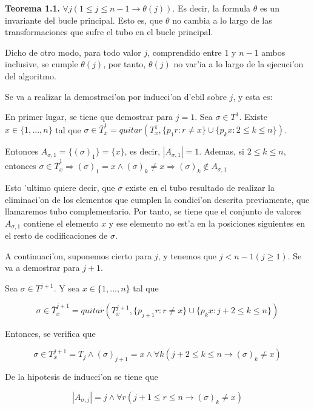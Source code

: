\documentclass[12pt]{article}
\begin{document}
\textbf{Teorema 1.1.} $\forall j (1 \leq j \leq n-1 \longrightarrow \theta(j))$. Es decir, la formula $\theta$ es un invariante del
bucle principal. Esto es, que $\theta$ no cambia a lo largo de las transformaciones que sufre el tubo en el bucle principal.

Dicho de otro modo, para todo valor $j$, comprendido entre $1$ y $n-1$ ambos inclusive, se cumple $\theta(j)$, por tanto, $\theta(j)$
no var'ia a lo largo de la ejecuci'on del algoritmo.

Se va a realizar la demostraci'on por inducci'on d'ebil sobre $j$, y esta es:

En primer lugar, se tiene que demostrar para $j = 1$. Sea $\sigma \in T^{1}$. Existe $x \in \{1,...,n\}$ tal que
$\sigma \in \bar{T}_{x}^{1} = quitar(T_{x}^{1}, \{p_{1}r : r \neq x\} \cup \{p_{k}x : 2 \leq k \leq n\})$.

Entonces $A_{\sigma,1} = \{(\sigma)_{1}\} = \{x\}$, es decir, $|A_{\sigma,1}| = 1$. Ademas, si $2 \leq k \leq n$, entonces
$\sigma \in \bar{T}_{x}^{1} \Longrightarrow (\sigma)_{1} = x \land (\sigma)_{k} \neq x \Longrightarrow (\sigma)_{k}
 \notin A_{\sigma,1}$

Esto 'ultimo quiere decir, que $\sigma$ existe en el tubo resultado de realizar la eliminaci'on de los elementos que cumplen
la condici'on descrita previamente, que llamaremos tubo complementario. Por tanto, se tiene que el conjunto de valores $A_{\sigma,1}$
contiene el elemento $x$ y ese elemento no est'a en la posiciones siguientes en el resto de codificaciones de $\sigma$.

A continuaci'on, suponemos cierto para $j$, y tenemos que $j < n - 1 (j \geq 1)$. Se va a demostrar para $j+1$.

Sea $\sigma \in T^{j+1}$. Y sea $x \in \{1,...,n\}$ tal que

\begin{equation*}
    \sigma \in \bar{T}_{x}^{j+1} = quitar(T_{x}^{j+1}, \{p_{j+1}r : r \neq x\} \cup \{p_{k}x : j + 2 \leq k \leq n\})
\end{equation*}

Entonces, se verifica que

\begin{equation*}
    \sigma \in T_{x}^{j+1} = T_{j} \land (\sigma)_{j+1} = x \land \forall k (j + 2 \leq k \leq n \longrightarrow (\sigma)_{k} \neq x)
\end{equation*}

De la hipotesis de inducci'on se tiene que

\begin{equation*}
    |A_{\sigma,j}| = j \land \forall r (j + 1 \leq r \leq n \longrightarrow (\sigma)_{k} \neq x)
\end{equation*}
\end{document}
